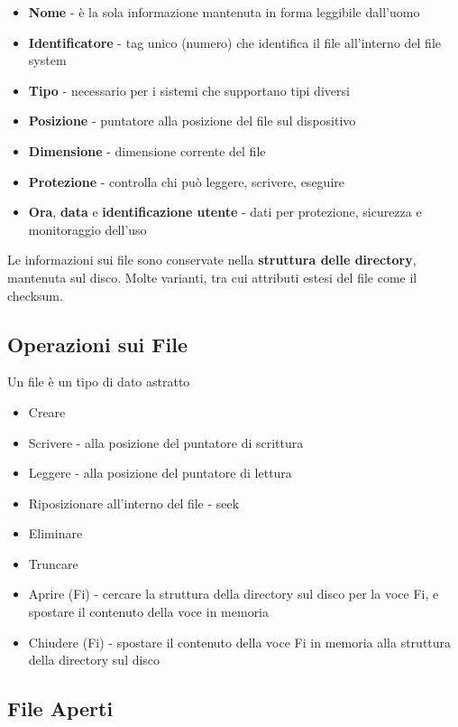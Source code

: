\begin{itemize}
  \item \textbf{Nome} - è la sola informazione mantenuta in forma leggibile dall'uomo
  \item \textbf{Identificatore} - tag unico (numero) che identifica il file all'interno del file system
  \item \textbf{Tipo} - necessario per i sistemi che supportano tipi diversi
  \item \textbf{Posizione} - puntatore alla posizione del file sul dispositivo
  \item \textbf{Dimensione} - dimensione corrente del file
  \item \textbf{Protezione} - controlla chi può leggere, scrivere, eseguire
  \item \textbf{Ora}, \textbf{data} e \textbf{identificazione utente} - dati per protezione, sicurezza e monitoraggio dell'uso
\end{itemize}

Le informazioni sui file sono conservate nella \textbf{struttura delle directory}, mantenuta sul disco. Molte varianti, tra cui attributi estesi del file come il checksum.

\subsection{Operazioni sui File}

Un file è un tipo di dato astratto
\begin{itemize}
  \item Creare
  \item Scrivere - alla posizione del puntatore di scrittura
  \item Leggere - alla posizione del puntatore di lettura
  \item Riposizionare all'interno del file - seek
  \item Eliminare
  \item Truncare
  \item Aprire (Fi) - cercare la struttura della directory sul disco per la voce Fi, e spostare il contenuto della voce in memoria
  \item Chiudere (Fi) - spostare il contenuto della voce Fi in memoria alla struttura della directory sul disco
\end{itemize}

\subsection{File Aperti}

